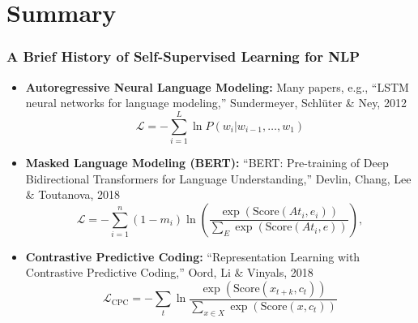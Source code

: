 \documentclass{beamer}
\begin{document}
\section[Summary]{Summary}
\setcounter{subsection}{1}



\begin{frame}
  \frametitle{A Brief History of Self-Supervised Learning for NLP}

  \begin{itemize}
  \item {\bf Autoregressive Neural Language Modeling:} Many papers,
    e.g., ``LSTM neural networks for language modeling,'' Sundermeyer,
    Schl{\"{u}}ter \& Ney, 2012
    \begin{displaymath}
      {\mathcal L}=-\sum_{i=1}^L \ln P(w_i|w_{i-1},\ldots,w_1)
    \end{displaymath}
  \item {\bf Masked Language Modeling (BERT):} ``BERT: Pre-training of
    Deep Bidirectional Transformers for Language Understanding,''
    Devlin, Chang, Lee \& Toutanova, 2018
    \begin{displaymath}
      {\mathcal L}=-\sum_{i=1}^n (1-m_i)\ln
      \left(\frac{\exp\left(\text{Score}(At_i,e_i)\right)}{\sum_E\exp\left(\text{Score}(At_i,e)\right)}
      \right),
    \end{displaymath}
  \item {\bf Contrastive Predictive Coding:} ``Representation Learning with
    Contrastive Predictive Coding,'' Oord, Li \& Vinyals, 2018
    \begin{displaymath}
      {\mathcal L}_{\text{CPC}} = -\sum_t \ln\frac{\exp\left(\text{Score}(x_{t+k},c_t)\right)}{\sum_{x\in X}\exp\left(\text{Score}(x,c_t)\right)}
    \end{displaymath}
  \end{itemize}
\end{frame}
\end{document}
